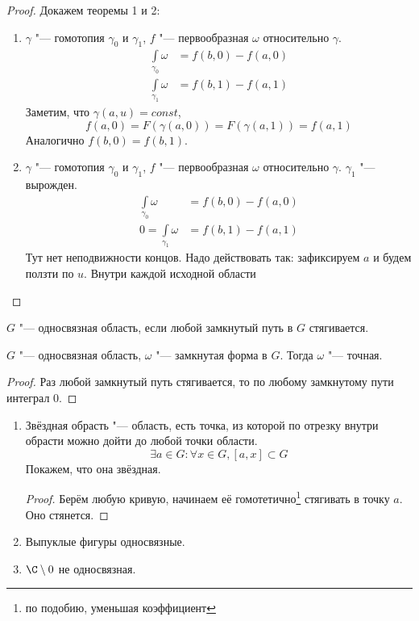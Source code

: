 \begin{proof}
	Докажем теоремы 1 и 2:
	\begin{enumerate}
	\item
		$\gamma$ "--- гомотопия $\gamma_0$ и $\gamma_1$, $f$ "--- первообразная $\omega$ относительно $\gamma$.
		\begin{align*}
			\int\limits_{\gamma_0} \omega &= f(b, 0) - f(a, 0) \\
			\int\limits_{\gamma_1} \omega &= f(b, 1) - f(a, 1)
		\end{align*}
		Заметим, что $\gamma(a, u) = const$,
		\[ f(a, 0) = F(\gamma(a, 0)) = F(\gamma(a, 1)) = f(a, 1) \]
		Аналогично $f(b, 0) = f(b, 1)$.

	\item
		$\gamma$ "--- гомотопия $\gamma_0$ и $\gamma_1$, $f$ "--- первообразная $\omega$ относительно $\gamma$.
		$\gamma_1$ "--- вырожден.
		\begin{align*}
			\int\limits_{\gamma_0} \omega &= f(b, 0) - f(a, 0) \\
			0 = \int\limits_{\gamma_1} \omega &= f(b, 1) - f(a, 1)
		\end{align*}
		Тут нет неподвижности концов. Надо действовать так: зафиксируем $a$ и будем ползти по $u$.
		Внутри каждой исходной области \TODO
	\end{enumerate}
\end{proof}

\begin{Def}
	$G$ "--- односвязная область, если любой замкнутый путь в $G$ стягивается.
\end{Def}

\begin{theorem}
	$G$ "--- односвязная область, $\omega$ "--- замкнутая форма в $G$.
	Тогда $\omega$ "--- точная.
\end{theorem}
\begin{proof}
	Раз любой замкнутый путь стягивается, то по любому замкнутому пути интеграл 0.
\end{proof}

\begin{exmp}\hfill\begin{enumerate}
\item
	Звёздная обрасть "--- область, есть точка, из которой по отрезку внутри обрасти можно дойти до любой точки области.
	\[ \exists a \in G\colon \forall x \in G, [a, x] \subset G \]
	Покажем, что она звёздная.
	\begin{proof}
		Берём любую кривую, начинаем её гомотетично\footnote{по подобию, уменьшая коэффициент} стягивать в точку $a$.
		Оно стянется.
	\end{proof}

\item
	Выпуклые фигуры односвязные.

\item
	$\C \setminus 0$ не односвязная.
\end{enumerate}\end{exmp}

